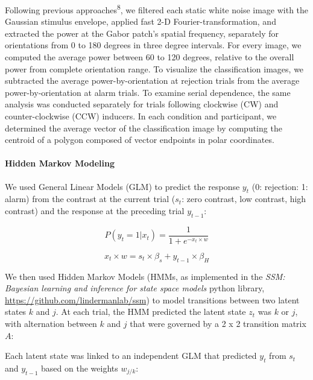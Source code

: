 \documentclass[
]{article}
\begin{document}
Following previous approaches\textsuperscript{8}, we filtered each
static white noise image with the Gaussian stimulus envelope, applied
fast 2-D Fourier-transformation, and extracted the power at the Gabor
patch's spatial frequency, separately for orientations from 0 to 180
degrees in three degree intervals. For every image, we computed the
average power between 60 to 120 degrees, relative to the overall power
from complete orientation range. To visualize the classification images,
we subtracted the average power-by-orientation at rejection trials from
the average power-by-orientation at alarm trials. To examine serial
dependence, the same analysis was conducted separately for trials
following clockwise (CW) and counter-clockwise (CCW) inducers. In each
condition and participant, we determined the average vector of the
classification image by computing the centroid of a polygon composed of
vector endpoints in polar coordinates.

\hypertarget{hidden-markov-modeling}{%
\paragraph{Hidden Markov Modeling}\label{hidden-markov-modeling}}

We used General Linear Models (GLM) to predict the response \(y_t\) (0:
rejection: 1: alarm) from the contrast at the current trial (\(s_t\):
zero contrast, low contrast, high contrast) and the response at the
preceding trial \(y_{t-1}\):

\begin{equation}
P(y_t = 1 | x_t) = \frac{1}{1 + e^{-x_t \times w}} 
\end{equation}

\begin{equation}
x_t \times w =  s_t \times \beta_s + y_{t-1} \times \beta_H
\end{equation}

We then used Hidden Markov Models (HMMs, as implemented in the
\emph{SSM: Bayesian learning and inference for state space models}
python library, \url{https://github.com/lindermanlab/ssm}) to model
transitions between two latent states \(k\) and \(j\). At each trial,
the HMM predicted the latent state \(z_t\) was \(k\) or \(j\), with
alternation between \(k\) and \(j\) that were governed by a 2 x 2
transition matrix \(A\):

Each latent state was linked to an independent GLM that predicted
\(y_t\) from \(s_t\) and \(y_{t-1}\) based on the weights \(w_{j/k}\):
\end{document}
